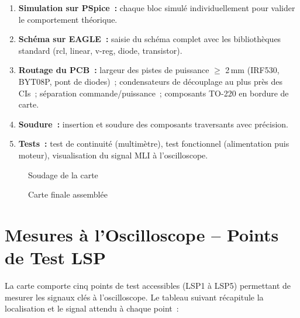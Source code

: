 \documentclass[a4paper,12pt,openany]{book}
\begin{document}
\begin{enumerate}
  \item \textbf{Simulation sur PSpice~:} chaque bloc simul\'e
        individuellement pour valider le comportement th\'eorique.
  \item \textbf{Sch\'ema sur EAGLE~:} saisie du sch\'ema complet avec
        les biblioth\`eques standard (rcl, linear, v-reg, diode, transistor).
  \item \textbf{Routage du PCB~:} largeur des pistes de puissance $\geq$
        2\,mm (IRF530, BYT08P, pont de diodes)~; condensateurs de d\'ecouplage
        au plus pr\`es des CIs~; s\'eparation commande/puissance~;
        composants TO-220 en bordure de carte.
  \item \textbf{Soudure~:} insertion et soudure des composants traversants
        avec pr\'ecision.
  \item \textbf{Tests~:} test de continuit\'e (multim\`etre), test
        fonctionnel (alimentation puis moteur), visualisation du signal MLI
        \`a l'oscilloscope.
\end{enumerate}

\begin{figure}[H]
  \centering
  \caption{Soudage de la carte}
  \label{fig:soudage}
\end{figure}

\begin{figure}[H]
  \centering
  \caption{Carte finale assembl\'ee}
  \label{fig:carte_finale}
\end{figure}

\section{Mesures \`a l'Oscilloscope -- Points de Test LSP}

La carte comporte cinq points de test accessibles (LSP1 \`a LSP5) permettant
de mesurer les signaux cl\'es \`a l'oscilloscope. Le tableau suivant
r\'ecapitule la localisation et le signal attendu \`a chaque point~:
\end{document}

